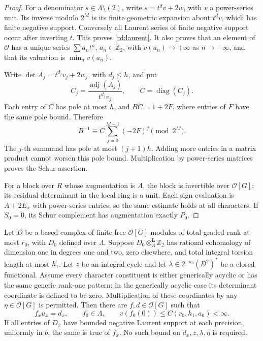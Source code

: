 \begin{proof}
For a denominator \(s\in\Lambda\setminus(2)\),
write \(s=t^d v+2w\), with \(v\) a power-series
unit.  Its inverse modulo \(2^M\) is its finite
geometric expansion about \(t^dv\), which has
finite negative support.  Conversely all Laurent
series of finite negative support occur after
inverting \(t\).  This proves \eqref{rd:laurent}.
It also proves that an element of \(\mathcal O\)
has a unique series \(\sum a_nt^n\), \(a_n\in\mathbb Z_2\),
with \(v(a_n)\to+\infty\) as \(n\to-\infty\),
and that its valuation is \(\min_n v(a_n)\).

Write \(\det A_j=t^{d_j}v_j+2w_j\), with
\(d_j\le h\), and put
\[
 C_j=\frac{\operatorname{adj}(A_j)}{t^{d_j}v_j},
 \qquad C=\operatorname{diag}(C_j).
 \]
Each entry of \(C\) has pole at most \(h\), and
\(BC=1+2F\), where entries of \(F\) have the same
pole bound.  Therefore
\begin{equation}
 B^{-1}\equiv C\sum_{j=0}^{M-1}(-2F)^j
                                  \pmod{2^M}.
 \label{rd:inverse-expansion}
\end{equation}
The \(j\)-th summand has pole at most \((j+1)h\).
Adding more entries in a matrix product cannot
worsen this pole bound.  Multiplication by
power-series matrices proves the Schur assertion.

For a block over \(R\) whose augmentation is \(A\),
the block is invertible over \(\mathcal O[G]\):
its residual determinant in the local ring is a
unit.  Each sign evaluation is \(A+2E_x\) with
power-series entries, so the same estimate holds
at all characters.  If \(S_0=0\), its Schur
complement has augmentation exactly \(P_0\).
\end{proof}

\begin{lemma}\label{rd:clearing}
Let \(D\) be a based complex of finite free
\(\mathcal O[G]\)-modules of total graded rank
at most \(r_0\), with \(D_0\) defined over
\(\Lambda\).  Suppose \(D_0\otimes_\Lambda^{\mathbf L}\mathbb Z_2\)
has rational cohomology of dimension one in degrees
one and two, zero elsewhere, and total integral
torsion length at most \(h_1\).
Let \(z\) be an integral cycle and let
\(\lambda\in2^{-a_0}(D^2)^*\) be a closed functional.
Assume every character constituent is either
generically acyclic or has the same generic rank-one pattern;
in the generically acyclic case its determinant coordinate
is defined to be zero.  Multiplication of these
coordinates by any \(\eta\in\mathcal O[G]\)
is permitted.  Then there are \(f,d\in\mathcal O[G]\)
such that
\begin{equation}
 f_xu_x=d_x,\qquad
 f_0\in\Lambda,\qquad
 v(f_0(0))\le C(r_0,h_1,a_0)<\infty.
 \label{rd:clearing-equations}
\end{equation}
If all entries of \(D_x\) have bounded negative
Laurent support at each precision, uniformly
in \(b\), the same is true of \(f_x\).
No such bound on \(d_x,z,\lambda,\eta\) is required.
\end{lemma}

